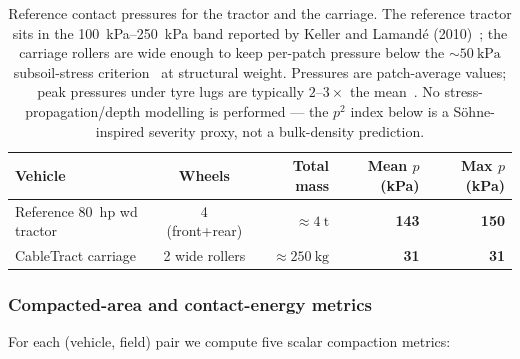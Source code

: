 \documentclass[11pt,a4paper]{article}
\begin{document}
\begin{table}[H]
\centering\small
\caption{Reference contact pressures for the tractor and the carriage. The reference tractor sits in the \SIrange{100}{250}{\kilo\pascal} band reported by Keller and Lamand\'e (2010)~\cite{keller2010compaction}; the carriage rollers are wide enough to keep per-patch pressure below the ${\sim}\SI{50}{\kilo\pascal}$ subsoil-stress criterion~\cite{schjonning2012rules} at structural weight. Pressures are patch-average values; peak pressures under tyre lugs are typically $2$--$3\times$ the mean~\cite{keller2010compaction}. No stress-propagation/depth modelling is performed --- the $p^2$ index below is a S\"ohne-inspired severity proxy, not a bulk-density prediction.}\label{tab:vehicle-pressures}
\begin{tabular}{lcrrr}
\toprule
Vehicle & Wheels & Total mass & Mean $p$ (kPa) & Max $p$ (kPa) \\
\midrule
Reference \SI{80}{hp} \gls{wd} tractor & 4 (front+rear) & ${\approx}\SI{4}{\tonne}$  & \textbf{143} & \textbf{150} \\
CableTract carriage                    & 2 wide rollers & ${\approx}\SI{250}{\kilogram}$ & \textbf{31}  & \textbf{31}  \\
\bottomrule
\end{tabular}
\end{table}

\subsubsection{Compacted-area and contact-energy metrics}\label{sec:compaction-metrics}

For each (vehicle, field) pair we compute five scalar compaction metrics:
\end{document}
